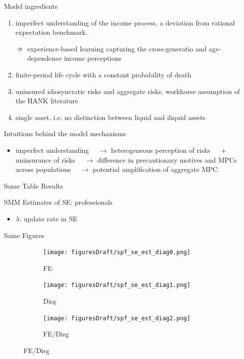 \documentclass{beamer}
\begin{document}
\begin{frame}{Model ingredients}
	
	\begin{enumerate}
		\item imperfect understanding of the income process, a deviation from rational expectation benchmark. 
		\begin{itemize}
			\item experience-based learning capturing the cross-generatio and age-dependence income perceptions
		\end{itemize}
		\item finite-period life cycle with a constant probability of death 
		\item uninsured idiosyncratic risks and aggregate risks, workhorse assumption of the HANK literature
		\item single asset, i.e. no distinction between liquid and iliquid assets 
	\end{enumerate}
\end{frame}

\begin{frame}{Intuitions behind the model mechanisms}
	\begin{itemize}
		\item imperfect understanding $ \quad \rightarrow$ heterogeneous perception of risks $ \quad \plus$ uninsurance of risks $ \quad \rightarrow$ difference in precautionary motives and MPCs across populations $ \quad \rightarrow$ potential amplification of aggregate MPC. 
	\end{itemize}
\end{frame}



\begin{frame}{Some Table Results}
	\begin{table}
		\centering
		\caption{SMM Estimates of SE: professionals}
		\label{SMM_Est_SE_SPF_Table}
	\end{table}
	\begin{itemize}
		\item $\lambda$: update rate in SE
	\end{itemize}
\end{frame}


\begin{frame}{Some Figures}
	\begin{figure}[ht]
		\label{figurelabel}
		\begin{subfigure}[b]{0.2\textwidth}
			\centering
			\caption{FE}
			\texttt{[image: figuresDraft/spf\_se\_est\_diag0.png]}
		\end{subfigure}
		\hfill
		\begin{subfigure}[b]{0.2\textwidth}
			\caption{Disg}
			\texttt{[image: figuresDraft/spf\_se\_est\_diag1.png]}
		\end{subfigure}
		\hfill
		\begin{subfigure}[b]{0.2\textwidth}
			\caption{FE/Disg}
			\texttt{[image: figuresDraft/spf\_se\_est\_diag2.png]}
		\end{subfigure}
	\end{figure}
\end{frame}
\end{document}
